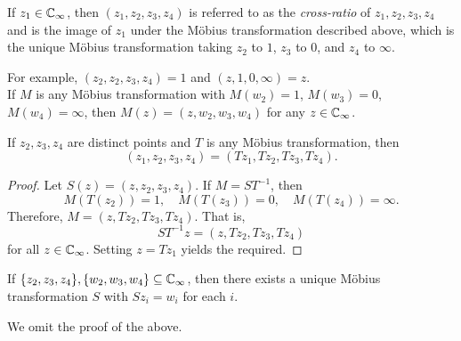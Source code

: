 	\begin{definition}
		If $z_1 \in \mathbb{C}_\infty$, then $(z_1,z_2,z_3,z_4)$ is referred to as the \emph{cross-ratio} of $z_1,z_2,z_3,z_4$ and is the image of $z_1$ under the M\"{o}bius transformation described above, which is the unique M\"{o}bius transformation taking $z_2$ to $1$, $z_3$ to $0$, and $z_4$ to $\infty$.
	\end{definition}

	For example, $(z_2,z_2,z_3,z_4) = 1$ and $(z,1,0,\infty) = z$.\\
	If $M$ is any M\"{o}bius transformation with $M(w_2) = 1$, $M(w_3) = 0$, $M(w_4) = \infty$, then $M(z) = (z,w_2,w_3,w_4)$ for any $z \in \mathbb{C}_\infty$.

	\begin{theorem}
		\label{thm: cross-product mobius equal}
		If $z_2,z_3,z_4$ are distinct points and $T$ is any M\"{o}bius transformation, then
		\[ (z_1,z_2,z_3,z_4) = (Tz_1,Tz_2,Tz_3,Tz_4). \]
	\end{theorem}
	\begin{proof}
		Let $S(z) = (z,z_2,z_3,z_4)$. If $M = ST^{-1}$, then
		\[ M(T(z_2)) = 1, \quad M(T(z_3)) = 0, \quad M(T(z_4)) = \infty. \]
		Therefore, $M = (z,Tz_2,Tz_3,Tz_4)$. That is,
		\[ ST^{-1}z = (z,Tz_2,Tz_3,Tz_4) \]
		for all $z \in \mathbb{C}_\infty$. Setting $z = Tz_1$ yields the required.
	\end{proof}

	\begin{lemma}
		If $\{z_2,z_3,z_4\},\{w_2,w_3,w_4\} \subseteq \mathbb{C}_\infty$, then there exists a unique M\"{o}bius transformation $S$ with $Sz_i = w_i$ for each $i$.
	\end{lemma}
	
	We omit the proof of the above.

